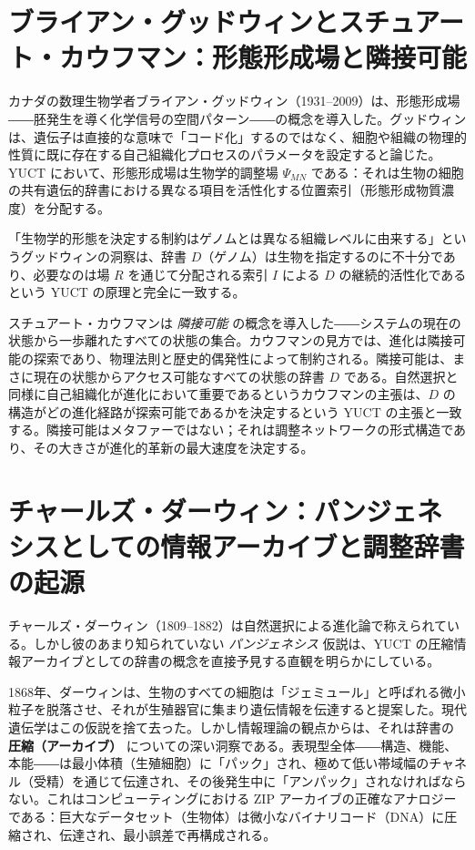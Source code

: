 \documentclass[12pt,a4paper]{article}
\begin{document}
	\section{ブライアン・グッドウィンとスチュアート・カウフマン：形態形成場と隣接可能}
	
	カナダの数理生物学者ブライアン・グッドウィン（1931–2009）は、形態形成場――胚発生を導く化学信号の空間パターン――の概念を導入した。グッドウィンは、遺伝子は直接的な意味で「コード化」するのではなく、細胞や組織の物理的性質に既に存在する自己組織化プロセスのパラメータを設定すると論じた。YUCT において、形態形成場は生物学的調整場 \(\Psi_{MN}\) である：それは生物の細胞の共有遺伝的辞書における異なる項目を活性化する位置索引（形態形成物質濃度）を分配する。
	
	「生物学的形態を決定する制約はゲノムとは異なる組織レベルに由来する」というグッドウィンの洞察は、辞書 \(D\)（ゲノム）は生物を指定するのに不十分であり、必要なのは場 \(R\) を通じて分配される索引 \(I\) による \(D\) の継続的活性化であるという YUCT の原理と完全に一致する。
	
	スチュアート・カウフマンは \emph{隣接可能} の概念を導入した――システムの現在の状態から一歩離れたすべての状態の集合。カウフマンの見方では、進化は隣接可能の探索であり、物理法則と歴史的偶発性によって制約される。隣接可能は、まさに現在の状態からアクセス可能なすべての状態の辞書 \(D\) である。自然選択と同様に自己組織化が進化において重要であるというカウフマンの主張は、\(D\) の構造がどの進化経路が探索可能であるかを決定するという YUCT の主張と一致する。隣接可能はメタファーではない；それは調整ネットワークの形式構造であり、その大きさが進化的革新の最大速度を決定する。
	
	\section{チャールズ・ダーウィン：パンジェネシスとしての情報アーカイブと調整辞書の起源}
	
	チャールズ・ダーウィン（1809–1882）は自然選択による進化論で称えられている。しかし彼のあまり知られていない \emph{パンジェネシス} 仮説は、YUCT の圧縮情報アーカイブとしての辞書の概念を直接予見する直観を明らかにしている。
	
	1868年、ダーウィンは、生物のすべての細胞は「ジェミュール」と呼ばれる微小粒子を脱落させ、それが生殖器官に集まり遺伝情報を伝達すると提案した。現代遺伝学はこの仮説を捨て去った。しかし情報理論の観点からは、それは辞書の \textbf{圧縮（アーカイブ）} についての深い洞察である。表現型全体――構造、機能、本能――は最小体積（生殖細胞）に「パック」され、極めて低い帯域幅のチャネル（受精）を通じて伝達され、その後発生中に「アンパック」されなければならない。これはコンピューティングにおける ZIP アーカイブの正確なアナロジーである：巨大なデータセット（生物体）は微小なバイナリコード（DNA）に圧縮され、伝達され、最小誤差で再構成される。
	
\end{document}
